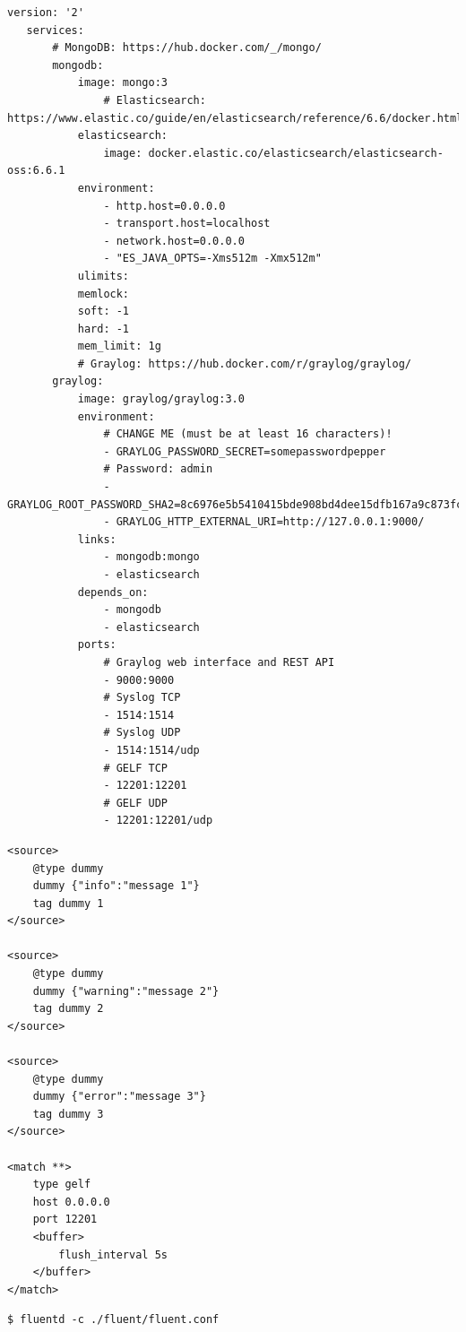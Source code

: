 \begin{lstlisting}[caption=docker-compose.yaml]
   version: '2'
   services:
       # MongoDB: https://hub.docker.com/_/mongo/
       mongodb:
           image: mongo:3
               # Elasticsearch: https://www.elastic.co/guide/en/elasticsearch/reference/6.6/docker.html
           elasticsearch:
               image: docker.elastic.co/elasticsearch/elasticsearch-oss:6.6.1
           environment:
               - http.host=0.0.0.0
               - transport.host=localhost
               - network.host=0.0.0.0
               - "ES_JAVA_OPTS=-Xms512m -Xmx512m"
           ulimits:
           memlock:
           soft: -1
           hard: -1
           mem_limit: 1g
           # Graylog: https://hub.docker.com/r/graylog/graylog/
       graylog:
           image: graylog/graylog:3.0
           environment:
               # CHANGE ME (must be at least 16 characters)!
               - GRAYLOG_PASSWORD_SECRET=somepasswordpepper
               # Password: admin
               - GRAYLOG_ROOT_PASSWORD_SHA2=8c6976e5b5410415bde908bd4dee15dfb167a9c873fc4bb8a81f6f2ab448a918
               - GRAYLOG_HTTP_EXTERNAL_URI=http://127.0.0.1:9000/
           links:
               - mongodb:mongo
               - elasticsearch
           depends_on:
               - mongodb
               - elasticsearch
           ports:
               # Graylog web interface and REST API
               - 9000:9000
               # Syslog TCP
               - 1514:1514
               # Syslog UDP
               - 1514:1514/udp
               # GELF TCP
               - 12201:12201
               # GELF UDP
               - 12201:12201/udp
\end{lstlisting}
\begin{lstlisting}[caption=Fluentd configuratie]
<source>
    @type dummy
    dummy {"info":"message 1"}
    tag dummy 1
</source>

<source>
    @type dummy
    dummy {"warning":"message 2"}
    tag dummy 2
</source>

<source>
    @type dummy
    dummy {"error":"message 3"}
    tag dummy 3
</source>

<match **>
    type gelf
    host 0.0.0.0
    port 12201
    <buffer>
        flush_interval 5s
    </buffer>
</match>
\end{lstlisting}
\begin{lstlisting}[caption=Uitvoeren van Fluentd met configuratie]
$ fluentd -c ./fluent/fluent.conf
\end{lstlisting}

